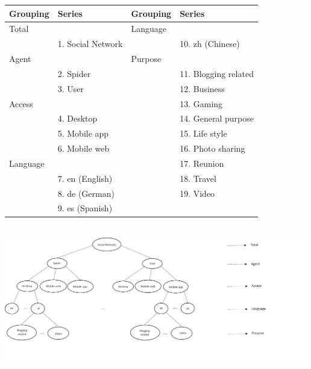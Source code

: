 \documentclass[11pt,a4paper,]{article}
\let\origfigure\figure
\let\endorigfigure\endfigure
\renewenvironment{figure}[1][2] {
    \expandafter\origfigure\expandafter[!htbp]
} {
    \endorigfigure
}
\let\origtable\table
\let\endorigtable\endtable
\renewenvironment{table}[1][2] {
    \expandafter\origtable\expandafter[!htbp]
} {
    \endorigtable
}
\begin{document}
\begin{table}[t]

\caption{\label{tab:wikipediagroupingstructure}Social networking Wikipedia article grouping structure}
\centering
\begin{tabular}{llll}
\toprule
Grouping & Series & Grouping & Series\\
\midrule
Total &  & Language & \\
 & 1. Social Network &  & 10. zh (Chinese)\\
Agent &  & Purpose & \\
 & 2. Spider &  & 11. Blogging related\\
 & 3. User &  & 12. Business\\
Access &  &  & 13. Gaming\\
 & 4. Desktop &  & 14. General purpose\\
 & 5. Mobile app &  & 15. Life style\\
 & 6. Mobile web &  & 16. Photo sharing\\
Language &  &  & 17. Reunion\\
 & 7. en (English) &  & 18. Travel\\
 & 8. de (German) &  & 19. Video\\
 & 9. es (Spanish) &  & \\
\bottomrule
\end{tabular}
\end{table}

\begin{figure}

{\centering \includegraphics[width=500px,height=250px]{Paper-Figures/Wiki_group_structure} 

}

\caption{One of the possible hierarchical structures for the Wikipedia pageview dataset.}\label{fig:wikigroupstructure}
\end{figure}
\end{document}
